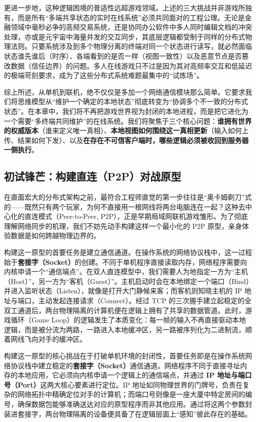 更进一步地，这种逻辑困境的普适性远超游戏领域。上述的三大挑战并非游戏所独有，而是所有“多端共享状态的实时在线系统”必须共同面对的工程公理。无论是金融领域中毫秒必争的高频交易系统，还是协同办公软件中多人同时编辑文档的冲突处理，亦或是元宇宙中海量并发的交互同步，其底层逻辑都受制于同样的分布式物理法则。只要系统涉及到多个物理分离的终端对同一个状态进行读写，就必然面临状态谁先谁后（时序）、各端看到的是否一样（视图一致性）以及恶意节点是否篡改数据（信任边界）的问题。多人在线游戏只不过是因为其对高频率交互和低延迟的极端苛刻要求，成为了这些分布式系统难题最集中的“试炼场”。

综上所述，从单机到联机，绝不仅仅是多加一个网络通信模块那么简单。它要求我们将思维模型从“维护一个确定的本地状态”彻底转变为“协调多个不一致的分布式状态”。在本章中，我们将不再把游戏世界视为封闭的本地进程，而是把它进化为一个需要“多终端共同维护”的在线系统。我们将聚焦于三个核心问题：\textbf{谁拥有世界的权威版本}（谁来定义唯一真相）、\textbf{本地视图如何围绕这一真相更新}（输入如何上传、结果如何下发）、以及\textbf{在存在不可信客户端时，哪些逻辑必须被收回到服务器一侧执行}。


 
\subsection{初试锋芒：构建直连（P2P）对战原型} %

在直面宏大的分布式架构之前，最符合工程师直觉的第一步往往是“奥卡姆剃刀”式的——既然只有两个玩家，为何不直接用一根网线将两台电脑连在一起？这种去中心化的直连模式（Peer-to-Peer, P2P），正是早期局域网联机游戏雏形。为了彻底理解网络同步的机理，我们不妨先动手构建这样一个最小化的 P2P 原型，亲身体验数据是如何跨越物理边界的。

构建这一原型的首要任务是建立通信通道。在操作系统的网络协议栈中，这一过程始于\textbf{套接字（Socket）}的创建。不同于单机程序直接读取内存，网络程序需要向内核申请一个“通信端点”。在双人直连模型中，我们需要人为地指定一方为“主机（Host）”，另一方为“客机（Guest）”。主机启动时会在本地绑定一个端口（Bind）并进入监听状态（Listen），就像是打开大门静候来客；而客机则知晓主机的 IP 地址与端口，主动发起连接请求（Connect）。经过 TCP 的三次握手建立起稳定的全双工通道后，两台物理隔离的计算机便在逻辑上拥有了共享的数据管道。此时，游戏循环（Game Loop）的逻辑发生了本质变化：每一帧的输入不再直接驱动本地逻辑，而是被分流为两路，一路进入本地缓冲区，另一路被序列化为二进制流，顺着网线飞向对手的缓冲区。

构建这一原型的核心挑战在于打破单机环境的封闭性，首要任务即是在操作系统网络协议栈中建立稳定的\textbf{套接字（Socket）}通信通道。网络程序不同于直接寻址内存的本地应用，它必须向内核申请一个逻辑上的通信端点，并通过 \textbf{IP 地址与端口号（Port）}这两大核心要素进行定位。IP 地址如同物理世界的门牌号，负责在复杂的网络拓扑中精确定位对手的计算机；而端口号则像是一座大厦中特定房间的编号，确保数据包能够准确送达对应的原型程序而非其他应用。通过将这两个参数封装进套接字，两台物理隔离的设备便具备了在逻辑层面上“感知”彼此存在的基础。

